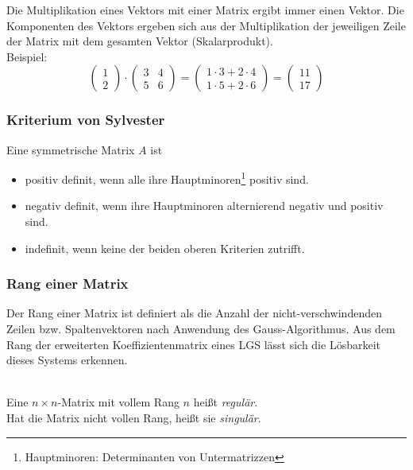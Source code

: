 Die Multiplikation eines Vektors mit einer Matrix ergibt immer einen Vektor. Die Komponenten des Vektors ergeben sich
aus der Multiplikation der jeweiligen Zeile der Matrix mit dem gesamten Vektor (Skalarprodukt).
\\Beispiel:
\begin{displaymath}
	\left(\begin{array}{c}1\\2\end{array}\right) \cdot \left(\begin{array}{cc}3 & 4\\5 & 6\end{array}\right)
	= \left(\begin{array}{c}1 \cdot 3 + 2 \cdot 4 
	\\ 1 \cdot 5 + 2 \cdot 6 \end{array}\right) = \left(\begin{array}{c}11\\17\end{array}\right)
\end{displaymath}

\subsubsection{Kriterium von Sylvester}
\label{ssub:kriterium_von_sylvester}

Eine symmetrische Matrix $A$ ist 
\begin{itemize}
	\item positiv definit, wenn alle ihre Hauptminoren\footnote{Hauptminoren: Determinanten von Untermatrizzen} positiv sind.
	\item negativ definit, wenn ihre Hauptminoren alternierend negativ und positiv sind.
	\item indefinit, wenn keine der beiden oberen Kriterien zutrifft.
\end{itemize}

\subsubsection{Rang einer Matrix}
\label{ssub:rang_einer_matrix}
Der Rang einer Matrix ist definiert als die Anzahl der nicht-verschwindenden Zeilen bzw. Spaltenvektoren nach Anwendung
des Gauss-Algorithmus. Aus dem Rang der erweiterten Koeffizientenmatrix eines LGS lässt sich die Lösbarkeit dieses
Systems erkennen.\\ \\
\begin{center}
	Eine $n \times n$-Matrix mit vollem Rang $n$ heißt \emph{regulär}.\\
	Hat die Matrix nicht vollen Rang, heißt sie \emph{singulär}.	
\end{center}


